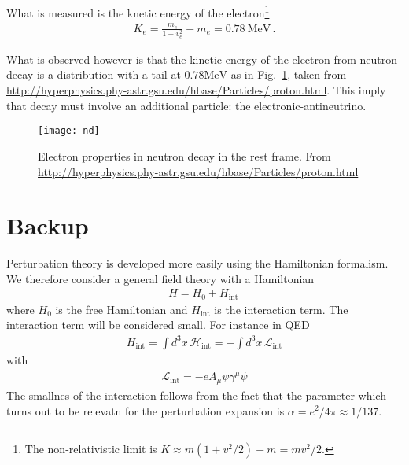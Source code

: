 What is measured is the knetic energy of the electron\footnote{The non-relativistic limit is $K\approx m(1+v^2/2)-m=mv^2/2.$}
\begin{align}
  K_e=\frac{m_e}{1-v_e^2}-m_e=0.78\ \text{MeV}\,.
\end{align}

What is observed however is that the kinetic energy of the electron from neutron decay is a distribution with a tail at $0.78\text{MeV}$ as in Fig.~\ref{fig:nd}, taken from \url{http://hyperphysics.phy-astr.gsu.edu/hbase/Particles/proton.html}. This imply that decay must involve an additional particle: the electronic-antineutrino.

\begin{figure}
  \centering
  \texttt{[image: nd]}
  \caption{Electron properties in neutron decay in the rest frame. From \url{http://hyperphysics.phy-astr.gsu.edu/hbase/Particles/proton.html}}
  \label{fig:nd}
\end{figure}


\section{Backup}
\label{sec:backup}

Perturbation theory is developed more easily using the Hamiltonian formalism. We therefore consider a general field theory with a Hamiltonian
\begin{align}
  \label{eq:75}
  H=H_0+H_{\text{int}}\,
\end{align}
where $H_0$ is the free Hamiltonian and $H_{\text{int}}$ is the interaction term. The interaction term will be considered small. For instance in QED
\begin{align}
  H_{\text{int}}=\int d^3x\,\mathcal{H}_{\text{int}}=-\int d^3x\,\mathcal{L}_{\text{int}}
\end{align}
with
\begin{align}
  \mathcal{L}_{\text{int}}=-e A_\mu\overline{\psi}\gamma^\mu\psi
\end{align}
The smallnes of the interaction follows from the fact that the parameter which turns out to be relevatn for the perturbation expansion is $\alpha=e^2/4\pi\approx1/137$.


